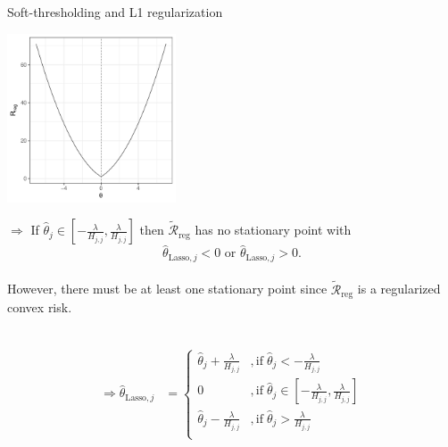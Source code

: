 \documentclass[11pt,compress,t,notes=noshow, xcolor=table]{beamer}
\begin{document}
\begin{vbframe}{Soft-thresholding and L1 regularization}
\begin{minipage}{0.4\textwidth}
    \includegraphics[width=5cm]{slides/regularization/figure/th_l1_zero.pdf}
\end{minipage}
\hfill
\begin{minipage}{0.49\textwidth}
$\Rightarrow$ If $\hat{\theta}_j \in [-\frac{\lambda}{H_{j,j}}, \frac{\lambda}{H_{j,j}}]$ then $\mathcal{\tilde R}_{\text{reg}}$ has no stationary point with $$\hat{\theta}_{\text{Lasso},j} < 0 \text{ or } \hat{\theta}_{\text{Lasso},j} > 0.$$ \\
However, there must be at least one stationary point since $\mathcal{\tilde R}_{\text{reg}}$ is a regularized convex risk.
\end{minipage}
 \\

\begin{align*}\Rightarrow \hat{\theta}_{\text{Lasso},j} &= \begin{cases} 
     \hat{\theta}_j + \frac{\lambda}{H_{j,j}} &, \text{if}   \;\hat{\theta}_j < -\frac{\lambda}{H_{j,j}} \\
       0 &, \text{if}   \;\hat{\theta}_j \in [-\frac{\lambda}{H_{j,j}}, \frac{\lambda}{H_{j,j}}] \\
     \hat{\theta}_j - \frac{\lambda}{H_{j,j}} &, \text{if}   \;\hat{\theta}_j > \frac{\lambda}{H_{j,j}} \\
     \end{cases}
     \end{align*}

\end{vbframe}

\endlecture
\end{document}
